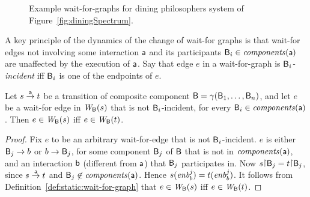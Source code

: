 \begin{figure*}[ht]
  \begin{center}
       \quad \quad
      \caption{Example wait-for-graphs for dining philosophers system of Figure~\ref{fig:diningSpectrum}.}
       \label{fig:wfg}
  \end{center}
\end{figure*}





A key principle of the dynamics of the change of wait-for graphs is that 
wait-for edges not involving some interaction
$\mathsf{a}$ and its participants $\mathsf{B}_i \in \mathit{components}(\mathsf{a})$ are unaffected by the execution
of $\mathsf{a}$.  Say that edge $e$ in a wait-for-graph
is \emph{$\mathsf{B}_i$-incident} iff $\mathsf{B}_i$ is one of the endpoints of $e$.


\begin{proposition} \label{prop:wait-for-edge-preservation}
Let $s \stackrel{\mathsf{a}}{\rightarrow} t$ be a transition of composite component $\mathsf{B} =
\gamma(\mathsf{B}_1,\dots,\mathsf{B}_n)$, and let $e$ be a wait-for edge in $\mathit{W}_{\mathsf{B}}({s})$
that is not $\mathsf{B}_i$-incident, for every $\mathsf{B}_i \in \mathit{components}(\mathsf{a})$. Then $e \in
\mathit{W}_{\mathsf{B}}({s})$ iff $e \in \mathit{W}_{\mathsf{B}}({t})$. 
\end{proposition}
%
%
\begin{proof}
Fix $e$ to be an arbitrary wait-for-edge that is not
$\mathsf{B}_i$-incident. $e$ is either $\mathsf{B}_j \rightarrow b$ or $b \rightarrow \mathsf{B}_j$, for some
component $\mathsf{B}_j$ of $\mathsf{B}$ that is not in $\mathit{components}(\mathsf{a})$, and an interaction $\mathsf{b}$
(different from $\mathsf{a}$) that $\mathsf{B}_j$ participates in.
%
Now $s \pj \B_j = t \pj \B_j$, since $s \stackrel{\mathsf{a}}{\rightarrow} t$ and $\mathsf{B}_j \not\in \mathit{components}(\mathsf{a})$. Hence $s(\mathit{enb}_{b}^{j}) =
t(\mathit{enb}_{b}^{j})$. It follows from Definition~\ref{def:static:wait-for-graph} that 
$e \in \mathit{W}_{\mathsf{B}}({s})$ iff $e \in \mathit{W}_{\mathsf{B}}({t})$.
\end{proof}



